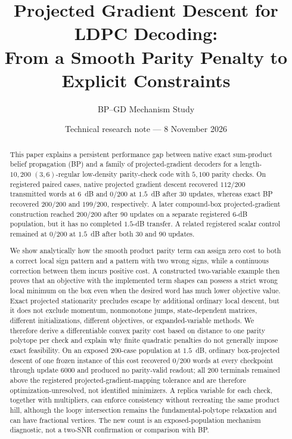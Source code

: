 \documentclass[11pt]{article}
\title{Projected Gradient Descent for LDPC Decoding:\\
From a Smooth Parity Penalty to Explicit Constraints}
\author{BP--GD Mechanism Study}
\date{Technical research note --- 8 November 2026}
\theoremstyle{remark}
\begin{document}
\maketitle

\begin{abstract}
This paper explains a persistent performance gap between native exact
sum-product belief propagation (BP) and a family of projected-gradient
decoders for a length-$10{,}200$ $(3,6)$-regular low-density parity-check code
with $5{,}100$ parity checks.  On registered paired
cases, native projected gradient descent recovered $112/200$ transmitted
words at $6$~dB and $0/200$ at $1.5$~dB after 30 updates, whereas exact BP
recovered $200/200$ and $199/200$, respectively.  A later compound-box
projected-gradient construction reached $200/200$ after 90 updates on a
separate registered $6$-dB population, but it has no completed $1.5$-dB
transfer.  A related registered scalar control remained at $0/200$ at
$1.5$~dB after both 30 and 90 updates.

We show analytically how the smooth product parity term can assign zero cost
to both a correct local sign pattern and a pattern with two wrong signs, while a
continuous correction between them incurs positive cost.  A constructed
two-variable example then proves that an objective with the implemented term
shapes can possess a strict wrong local minimum on the box even when the
desired word has much lower objective value.  Exact projected stationarity
precludes escape by additional ordinary local descent, but it does not exclude
momentum, nonmonotone jumps, state-dependent matrices, different
initializations, different objectives, or expanded-variable methods.  We
therefore derive a differentiable convex parity cost based on distance to one
parity polytope per check and explain why finite quadratic penalties do not
generally impose exact feasibility.  On an exposed 200-case population at
$1.5$~dB, ordinary box-projected descent of one frozen instance of this cost
recovered $0/200$ words at every checkpoint through update 6000 and produced
no parity-valid readout; all 200 terminals remained above the registered
projected-gradient-mapping tolerance and are therefore optimization-unresolved,
not identified minimizers.  A replica variable for each check, together with
multipliers, can
enforce consistency without recreating the same product hill, although the
loopy intersection remains the fundamental-polytope relaxation and can have
fractional vertices.  The new count is an exposed-population mechanism
diagnostic, not a two-SNR confirmation or comparison with BP.
\end{abstract}
\end{document}
